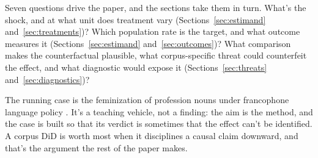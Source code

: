 Seven questions drive the paper, and the sections take them in turn. What's the shock, and at what unit does treatment vary (Sections~\ref{sec:estimand} and~\ref{sec:treatments})? Which population rate is the target, and what outcome measures it (Sections~\ref{sec:estimand} and~\ref{sec:outcomes})? What comparison makes the counterfactual plausible, what corpus-specific threat could counterfeit the effect, and what diagnostic would expose it (Sections~\ref{sec:threats} and~\ref{sec:diagnostics})?

The running case is the feminization of profession nouns under francophone language policy \citep{Fujimura2005,BurnettBonami2019}. It's a teaching vehicle, not a finding: the aim is the method, and the case is built so that its verdict is sometimes that the effect can't be identified. A corpus DiD is worth most when it disciplines a causal claim downward, and that's the argument the rest of the paper makes.
